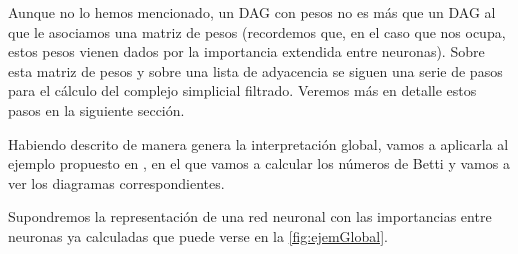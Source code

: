 \documentclass[12pt, a4paper, twoside]{book}
\numberwithin{equation}{section}
\theoremstyle{definition}
\newenvironment{ejem}
  {\pushQED{\qed}\renewcommand{\qedsymbol}{$\blacktriangleleft$}\ejemplo}
  {\popQED\endejemplo}
\theoremstyle{remark}
\theoremstyle{plain}
\begin{document}
	Aunque no lo hemos mencionado, un DAG con pesos no es más que un DAG
	al que le asociamos una matriz de pesos (recordemos que, en el caso 
	que nos ocupa, estos pesos vienen dados por la importancia extendida 
	entre neuronas). Sobre esta matriz de pesos y sobre una lista de 
	adyacencia se siguen una serie de pasos para el cálculo del complejo 
	simplicial filtrado. Veremos más en detalle estos pasos en la 
	siguiente sección. 

	Habiendo descrito de manera genera la interpretación global, vamos a 
	aplicarla al ejemplo propuesto en \cite{Articulo-Watanabe}, en el que 
	vamos a calcular los números de Betti y vamos a ver los diagramas 
	correspondientes.

	\begin{ejem}
		Supondremos la representación de una red neuronal con las 
		importancias entre neuronas ya calculadas que puede verse en 
		la \autoref{fig:ejemGlobal}.

		\begin{figure}[!htbp]
				\centering
\end{figure}
\end{ejem}
\end{document}
